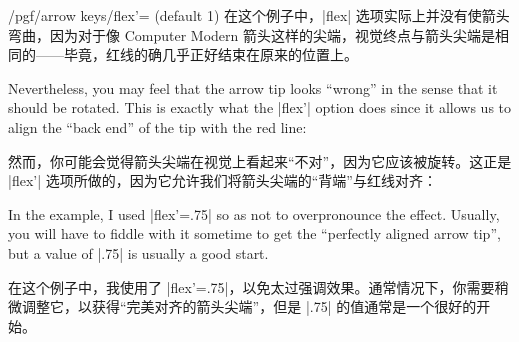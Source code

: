 \begin{key}{/pgf/arrow keys/flex'= (default 1)}
    在这个例子中，|flex| 选项实际上并没有使箭头弯曲，因为对于像 Computer Modern 箭头这样的尖端，视觉终点与箭头尖端是相同的——毕竟，红线的确几乎正好结束在原来的位置上。

    Nevertheless, you may feel that the arrow tip looks ``wrong'' in the sense
    that it should be rotated. This is exactly what the |flex'| option does
    since it allows us to align the ``back end'' of the tip with the red line:
    
    然而，你可能会觉得箭头尖端在视觉上看起来“不对”，因为它应该被旋转。这正是 |flex'| 选项所做的，因为它允许我们将箭头尖端的“背端”与红线对齐：

\begin{codeexample}[preamble={\usetikzlibrary{arrows.meta,bending}}]
\end{codeexample}
    In the example, I used |flex'=.75| so as not to overpronounce the effect.
    Usually, you will have to fiddle with it sometime to get the ``perfectly
    aligned arrow tip'', but a value of |.75| is usually a good start.

    在这个例子中，我使用了 |flex'=.75|，以免太过强调效果。通常情况下，你需要稍微调整它，以获得“完美对齐的箭头尖端”，但是 |.75| 的值通常是一个很好的开始。
\end{key}

